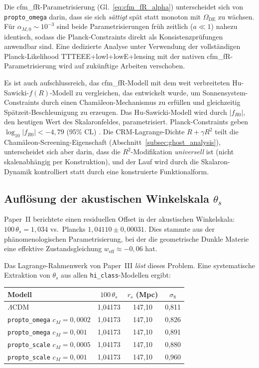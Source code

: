 \documentclass[11pt,a4paper]{article}
\begin{document}
Die cfm\_fR-Parametrisierung (Gl.~\ref{eq:cfm_fR_alpha}) unterscheidet sich von \texttt{propto\_omega} darin, dass sie sich \textit{s\"attigt} sp\"at statt monoton mit $\Omega_{\mathrm{DE}}$ zu w\"achsen. F\"ur $\alpha_{M,0} \sim 10^{-3}$ sind beide Parametrisierungen fr\"uh zeitlich ($a \ll 1$) nahezu identisch, sodass die Planck-Constraints direkt als Konsistenzpr\"ufungen anwendbar sind. Eine dedizierte Analyse unter Verwendung der vollst\"andigen Planck-Likelihood TTTEEE+lowl+lowE+lensing mit der nativen cfm\_fR-Parametrisierung wird auf zuk\"unftige Arbeiten verschoben.

Es ist auch aufschlussreich, das cfm\_fR-Modell mit dem weit verbreiteten Hu-Sawicki-$f(R)$-Modell \cite{HuSawicki2007} zu vergleichen, das entwickelt wurde, um Sonnensystem-Constraints durch einen Cham\"aleon-Mechanismus zu erf\"ullen und gleichzeitig Sp\"atzeit-Beschleunigung zu erzeugen. Das Hu-Sawicki-Modell wird durch $|f_{R0}|$, den heutigen Wert des Skalaronfeldes, parametrisiert. Planck-Constraints geben $\log_{10}|f_{R0}| < -4{,}79$ (95\% CL) \cite{PlanckMG2016}. Die CRM-Lagrange-Dichte $R + \gamma R^2$ teilt die Cham\"aleon-Screening-Eigenschaft (Abschnitt~\ref{subsec:ghost_analysis}), unterscheidet sich aber darin, dass die $R^2$-Modifikation \textit{universell} ist (nicht skalenabh\"angig per Konstruktion), und der Lauf wird durch die Skalaron-Dynamik kontrolliert statt durch eine konstruierte Funktionalform.

\subsection{Aufl\"osung der akustischen Winkelskala $\theta_s$}
\label{subsec:theta_s}

Paper~II berichtete einen residuellen Offset in der akustischen Winkelskala: $100\,\theta_s = 1{,}034$ vs.\ Plancks $1{,}04110 \pm 0{,}00031$. Dies stammte aus der ph\"anomenologischen Parametrisierung, bei der die geometrische Dunkle Materie eine effektive Zustandsgleichung $w_{\mathrm{eff}} \approx -0{,}06$ hat.

Das Lagrange-Rahmenwerk von Paper~III \textit{l\"ost} dieses Problem. Eine systematische Extraktion von $\theta_s$ aus allen \texttt{hi\_class}-Modellen ergibt:

\begin{center}
\begin{tabular}{lccc}
\toprule
\textbf{Modell} & $100\,\theta_s$ & $r_s$ (Mpc) & $\sigma_8$ \\
\midrule
$\Lambda$CDM & 1,04173 & 147,10 & 0,811 \\
\texttt{propto\_omega} $c_M = 0{,}0002$ & 1,04173 & 147,10 & 0,826 \\
\texttt{propto\_omega} $c_M = 0{,}001$ & 1,04173 & 147,10 & 0,891 \\
\texttt{propto\_scale} $c_M = 0{,}0005$ & 1,04173 & 147,10 & 0,880 \\
\texttt{propto\_scale} $c_M = 0{,}001$ & 1,04173 & 147,10 & 0,960 \\
\bottomrule
\end{tabular}
\label{tab:theta_s}
\end{center}
\end{document}

